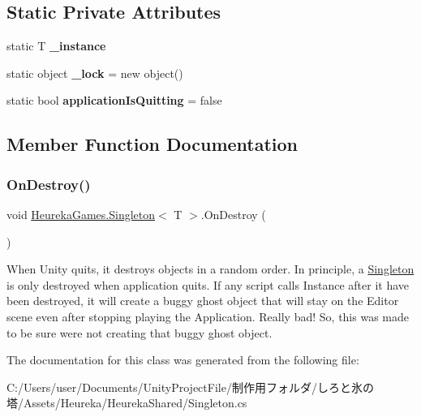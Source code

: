 \subsection*{Static Private Attributes}
\begin{DoxyCompactItemize}
\item 
\mbox{\label{class_heureka_games_1_1_singleton_a9394a807f0bc63bded2413d215f1c5e2}} 
static T {\bfseries \+\_\+instance}
\item 
\mbox{\label{class_heureka_games_1_1_singleton_a78a587b92922d705cb13945bed6d6f0d}} 
static object {\bfseries \+\_\+lock} = new object()
\item 
\mbox{\label{class_heureka_games_1_1_singleton_a67e62d2cd1cc24f776c6316b1eca7c94}} 
static bool {\bfseries application\+Is\+Quitting} = false
\end{DoxyCompactItemize}


\subsection{Member Function Documentation}
\mbox{\label{class_heureka_games_1_1_singleton_adbd535470ab8239e2926a8016e2aea53}} 
\subsubsection{\texorpdfstring{On\+Destroy()}{OnDestroy()}}
{\footnotesize\ttfamily void \hyperlink{class_heureka_games_1_1_singleton}{Heureka\+Games.\+Singleton}$<$ T $>$.On\+Destroy (\begin{DoxyParamCaption}{ }\end{DoxyParamCaption})\hspace{0.3cm}{\ttfamily [inline]}}



When Unity quits, it destroys objects in a random order. In principle, a \hyperlink{class_heureka_games_1_1_singleton}{Singleton} is only destroyed when application quits. If any script calls Instance after it have been destroyed, it will create a buggy ghost object that will stay on the Editor scene even after stopping playing the Application. Really bad! So, this was made to be sure we\textquotesingle{}re not creating that buggy ghost object. 



The documentation for this class was generated from the following file\+:\begin{DoxyCompactItemize}
\item 
C\+:/\+Users/user/\+Documents/\+Unity\+Project\+File/制作用フォルダ/しろと氷の塔/\+Assets/\+Heureka/\+Heureka\+Shared/Singleton.\+cs\end{DoxyCompactItemize}
